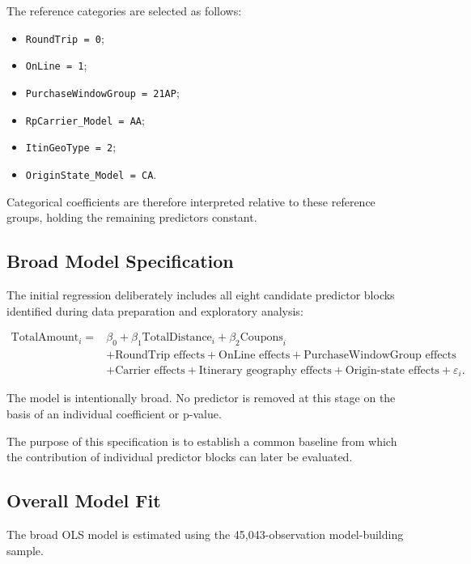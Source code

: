 \documentclass[11pt,a4paper]{article}
\begin{document}
The reference categories are selected as follows:

\begin{itemize}
    \item \texttt{RoundTrip = 0};
    \item \texttt{OnLine = 1};
    \item \texttt{PurchaseWindowGroup = 21AP};
    \item \texttt{RpCarrier\_Model = AA};
    \item \texttt{ItinGeoType = 2};
    \item \texttt{OriginState\_Model = CA}.
\end{itemize}

Categorical coefficients are therefore interpreted relative to these reference groups, holding the remaining predictors constant.

\subsection{Broad Model Specification}

The initial regression deliberately includes all eight candidate predictor blocks identified during data preparation and exploratory analysis:

\[
\begin{aligned}
\text{TotalAmount}_i
={}&
\beta_0
+\beta_1 \text{TotalDistance}_i
+\beta_2 \text{Coupons}_i \\
&+\text{RoundTrip effects}
+\text{OnLine effects}
+\text{PurchaseWindowGroup effects} \\
&+\text{Carrier effects}
+\text{Itinerary geography effects}
+\text{Origin-state effects}
+\varepsilon_i.
\end{aligned}
\]

The model is intentionally broad. No predictor is removed at this stage on the basis of an individual coefficient or p-value.

The purpose of this specification is to establish a common baseline from which the contribution of individual predictor blocks can later be evaluated.

\subsection{Overall Model Fit}

The broad OLS model is estimated using the 45,043-observation model-building sample.
\end{document}
